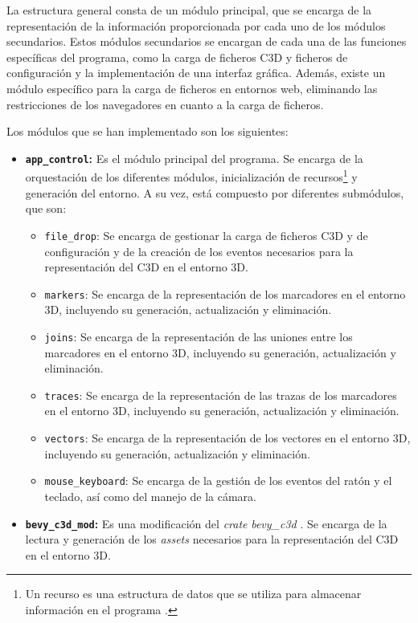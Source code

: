 La estructura general consta de un módulo principal, que se encarga de la representación de la información proporcionada por cada uno de los módulos secundarios. Estos módulos secundarios se encargan de cada una de las funciones específicas del programa, como la carga de ficheros \ac{C3D} y ficheros de configuración y la implementación de una interfaz gráfica. Además, existe un módulo específico para la carga de ficheros en entornos web, eliminando las restricciones de los navegadores en cuanto a la carga de ficheros.

Los módulos que se han implementado son los siguientes:

\begin{itemize}
    \item \textbf{\texttt{app\_control}:} Es el módulo principal del programa. Se encarga de la orquestación de los diferentes módulos, inicialización de recursos\footnote{Un recurso es una estructura de datos que se utiliza para almacenar información en el programa \autocite{Resources,ResourcesUnofficialBevy}.} y generación del entorno. A su vez, está compuesto por diferentes submódulos, que son:
    \begin{itemize}
        \item \texttt{file\_drop}: Se encarga de gestionar la carga de ficheros \ac{C3D} y de configuración y de la creación de los eventos necesarios para la representación del \ac{C3D} en el entorno 3D.
        \item \texttt{markers}: Se encarga de la representación de los marcadores en el entorno 3D, incluyendo su generación, actualización y eliminación.
        \item \texttt{joins}: Se encarga de la representación de las uniones entre los marcadores en el entorno 3D, incluyendo su generación, actualización y eliminación. 
        \item \texttt{traces}: Se encarga de la representación de las trazas de los marcadores en el entorno 3D, incluyendo su generación, actualización y eliminación.
        \item \texttt{vectors}: Se encarga de la representación de los vectores en el entorno 3D, incluyendo su generación, actualización y eliminación.
        \item \texttt{mouse\_keyboard}: Se encarga de la gestión de los eventos del ratón y el teclado, así como del manejo de la cámara.
    \end{itemize}
    \item \textbf{\texttt{bevy\_c3d\_mod}:} Es una modificación del \textit{crate} \textit{bevy\_c3d} \autocite{BiomechanicsfoundationBevy_c3d2024}. Se encarga de la lectura y generación de los \textit{assets} necesarios para la representación del \ac{C3D} en el entorno 3D. 

\end{itemize}
